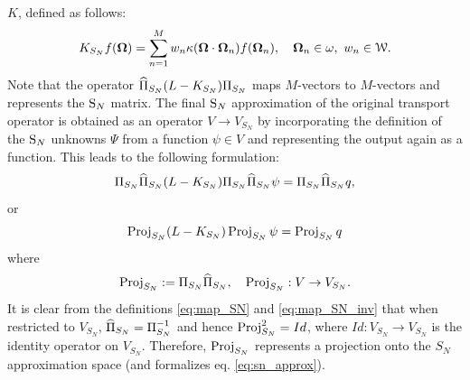 $K$, defined as follows: 
\begin{equation}\label{eq:KSN}
	\op{K}_{S_N} f(\bomega) = \sum_{n=1}^{M} w_n \kappa(\bomega\cdot\bomega_n) f(\bomega_n), \quad \bomega_n\in \omega,\ 
	w_n\in \mathcal{W}. 
\end{equation}
Note that the operator $\PihSN (\op{L} -
\op{K}_{S_N}) \PiSN$ maps $M$-vectors to $M$-vectors and represents the $\SN$ matrix. The
final $\SN$ approximation of the original transport operator is obtained as an operator $V \to V_{S_N}$ by incorporating the definition of the $\SN$ unknowns $\Psi$ from a function
$\psi \in V$ and representing the output again as a function. This leads to the following formulation:
\begin{equation}\label{eq:sn_op}
	\PiSN \PihSN (\op{L} - \op{K}_{S_N})\PiSN \PihSN \psi = \PiSN \PihSN q,
\end{equation}
or
\begin{equation}\label{eq:sn_op2}
	\Projop[S_N]  (\op{L} - \op{K}_{S_N}) \Projop[S_N] \psi = \Projop[S_N] q
\end{equation}
where
\begin{equation}\label{eq:proj_sn}
	\Projop[S_N] := \PiSN \PihSN, \quad \Projop[S_N] : V \to V_{S_N}.
\end{equation} 
It is clear from the definitions \eqref{eq:map_SN} and \eqref{eq:map_SN_inv} that when restricted to $V_{S_N}$, 
\linebreak[3]\mbox{$\PihSN = \PiSN^{-1}$} and hence $\Projop[S_N]^2 = Id$, where $Id : V_{S_N} \to V_{S_N}$ is the
identity operator on $V_{S_N}$.
 Therefore, $\Projop[S_N]$ represents a projection onto the $S_N$ approximation space (and formalizes eq.
 \eqref{eq:sn_approx}).


\label{sec:SI}



